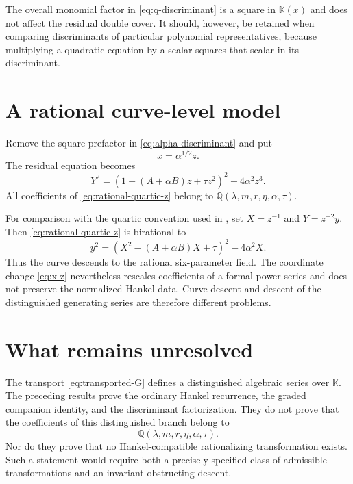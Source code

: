 \documentclass[11pt]{article}
\theoremstyle{definition}
\theoremstyle{remark}
\newcommand{\K}{\mathbb{K}}
\newcommand{\Q}{\mathbb{Q}}
\begin{document}
The overall monomial factor in \eqref{eq:q-discriminant} is a square in
$\K(x)$ and does not affect the residual double cover.  It should, however,
be retained when comparing discriminants of particular polynomial
representatives, because multiplying a quadratic equation by a scalar squares
that scalar in its discriminant.

\section{A rational curve-level model}
Remove the square prefactor in \eqref{eq:alpha-discriminant} and put
\begin{equation}
 x=\alpha^{1/2}z.
 \label{eq:x-z}
\end{equation}
The residual equation becomes
\begin{equation}
 Y^2=\left(1-(A+\alpha B)z+\tau z^2\right)^2
      -4\alpha^2z^3.
 \label{eq:rational-quartic-z}
\end{equation}
All coefficients of \eqref{eq:rational-quartic-z} belong to
$\Q(\lambda,m,r,\eta,\alpha,\tau)$.

For comparison with the quartic convention used in \cite{Scheuerle2026}, set
$X=z^{-1}$ and $Y=z^{-2}y$.  Then \eqref{eq:rational-quartic-z} is birational
to
\begin{equation}
 y^2=\left(X^2-(A+\alpha B)X+\tau\right)^2-4\alpha^2X.
 \label{eq:rational-quartic-X}
\end{equation}
Thus the curve descends to the rational six-parameter field.  The coordinate
change \eqref{eq:x-z} nevertheless rescales coefficients of a formal power
series and does not preserve the normalized Hankel data.  Curve descent and
descent of the distinguished generating series are therefore different
problems.

\section{What remains unresolved}
The transport \eqref{eq:transported-G} defines a distinguished algebraic
series over $\K$.  The preceding results prove the ordinary Hankel recurrence,
the graded companion identity, and the discriminant factorization.  They do
not prove that the coefficients of this distinguished branch belong to
\[
 \Q(\lambda,m,r,\eta,\alpha,\tau).
\]
Nor do they prove that no Hankel-compatible rationalizing transformation
exists.  Such a statement would require both a precisely specified class of
admissible transformations and an invariant obstructing descent.
\end{document}
